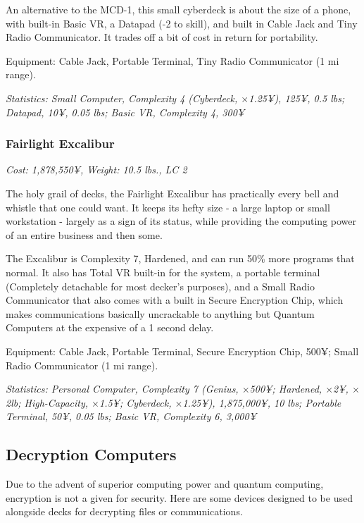 \begin{multicols}{3}
	An alternative to the MCD-1, this small cyberdeck is about the size of a phone, with built-in Basic VR, a Datapad (-2 to skill), and built in Cable Jack and Tiny Radio Communicator. It trades off a bit of cost in return for portability.
	
	Equipment: Cable Jack, Portable Terminal, Tiny Radio Communicator (1 mi range).
	
	\textit{\textcolor{OliveGreen}{Statistics: Small Computer, Complexity 4 (Cyberdeck, \(\times\)1.25¥), 125¥, 0.5 lbs; Datapad, 10¥, 0.05 lbs; Basic VR, Complexity 4, 300¥}}
	
	\subsubsection*{Fairlight Excalibur}
	
	\textit{\textcolor{NavyBlue}{Cost: 1,878,550¥, Weight: 10.5 lbs., LC 2}}
	
	The holy grail of decks, the Fairlight Excalibur has practically every bell and whistle that one could want. It keeps its hefty size - a large laptop or small workstation - largely as a sign of its status, while providing the computing power of an entire business and then some.
	
	The Excalibur is Complexity 7, Hardened, and can run 50\% more programs that normal. It also has Total VR built-in for the system, a portable terminal (Completely detachable for most decker's purposes), and a Small Radio Communicator that also comes with a built in Secure Encryption Chip, which makes communications basically uncrackable to anything but Quantum Computers at the expensive of a 1 second delay.
	
	Equipment: Cable Jack, Portable Terminal, Secure Encryption Chip, 500¥; Small Radio Communicator (1 mi range).
	
	\textit{\textcolor{OliveGreen}{Statistics: Personal Computer, Complexity 7 (Genius, \(\times\)500¥; Hardened, \(\times\)2¥, \(\times\)2lb; High-Capacity, \(\times\)1.5¥; Cyberdeck, \(\times\)1.25¥), 1,875,000¥, 10 lbs; Portable Terminal, 50¥, 0.05 lbs; Basic VR, Complexity 6, 3,000¥}}
	
	\subsection{Decryption Computers}
	
	Due to the advent of superior computing power and quantum computing, encryption is not a given for security. Here are some devices designed to be used alongside decks for decrypting files or communications.
	

\end{multicols}
